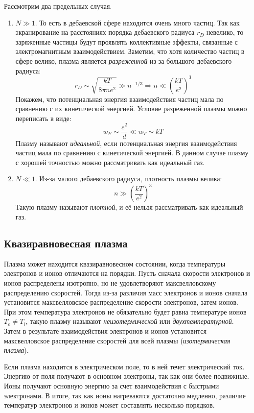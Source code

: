 Рассмотрим два предельных случая.
\begin{enumerate}
	\item $N \gg 1$. То есть в дебаевской сфере находится очень много частиц. Так как экранирование на расстояниях порядка дебаевского радиуса $r_D$ невелико, то заряженные частицы будут проявлять коллективные эффекты, связанные с электромагнитным взаимодействием. Заметим, что хотя количество частиц в сфере велико, плазма является \textit{разреженной} из-за большого дебаевского радиуса:
	$$
	r_D \sim \sqrt{\frac{kT}{8 \pi n e^2}} \gg n^{-1/3} \Rightarrow n \ll \left( \frac{kT}{e^2} \right)^3
	$$
	Покажем, что потенциальная энергия взаимодействия частиц мала по сравнению с их кинетической энергией. Условие разреженной плазмы можно переписать в виде:
	$$w_E \sim \frac{e^2}{d} \ll w_T \sim kT$$
	Плазму называют \textit{идеальной}, если потенциальная энергия взаимодействия частиц мала по сравнению с кинетической энергией. В данном случае плазму с хорошей точностью можно рассматривать как идеальный газ.
	
	\item $N \ll 1$. Из-за малого дебаевского радиуса, плотность плазмы велика:
	$$n \gg \left( \frac{kT}{e^2} \right)^3$$
	Такую плазму называют \textit{плотной}, и её нельзя рассматривать как идеальный газ.
\end{enumerate}

\subsection*{Квазиравновесная плазма}

Плазма может находится квазиравновесном состоянии, когда температуры электронов и ионов отличаются на порядки. Пусть сначала скорости электронов и ионов распределены изотропно, но не удовлетворяют максвелловскому распределению скоростей. Тогда из-за различия масс электронов и ионов сначала установится максвелловское распределение скорости электронов, затем ионов. При этом температура электронов не обязательно будет равна температуре ионов $T_e \neq T_i$, такую плазму называют \textit{неизотермической} или \textit{двухтемпературной}. Затем в результате взаимодействия электронов и ионов установится максвелловское распределение скоростей для всей плазмы (\textit{изотермическая плазма}).

Если плазма находится в электрическом поле, то в ней течет электрический ток. Энергию от поля получают в основном электроны, так как они более подвижные. Ионы получают основную энергию за счет взаимодействия с быстрыми электронами. В итоге, так как ионы нагреваются достаточно медленно, различие температур электронов и ионов может составлять несколько порядков.


